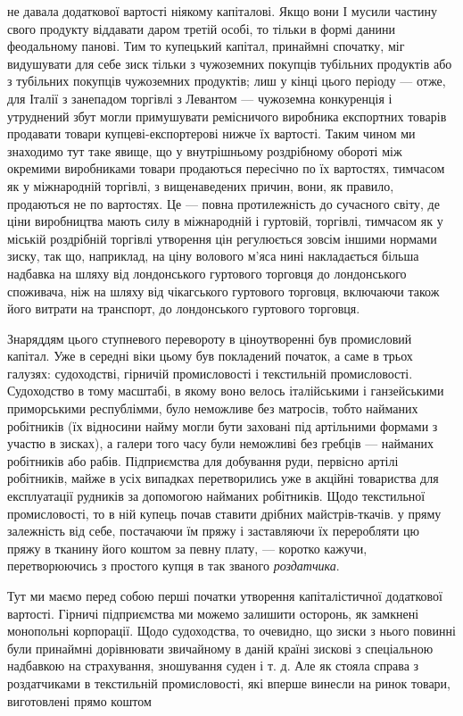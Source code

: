 \parcont{}  %
не давала додаткової вартості ніякому капіталові. Якщо вони І мусили частину свого продукту віддавати даром третій особі, то
тільки в формі данини феодальному панові. Тим то купецький капітал, принаймні спочатку, міг видушувати для себе зиск тільки
з чужоземних покупців тубільних продуктів або з тубільних покупців чужоземних продуктів; лиш у кінці цього періоду — отже,
для Італії з занепадом торгівлі з Левантом — чужоземна конкуренція і утруднений збут могли примушувати ремісничого виробника
експортних товарів продавати товари купцеві-експортерові нижче їх вартості. Таким чином ми знаходимо тут таке явище, що у
внутрішньому роздрібному обороті між окремими виробниками товари продаються пересічно по їх вартостях, тимчасом як у
міжнародній торгівлі, з вищенаведених причин, вони, як правило, продаються не по вартостях. Це — повна протилежність до
сучасного світу, де ціни виробництва мають силу в міжнародній і гуртовій, торгівлі, тимчасом як у міській роздрібній
торгівлі утворення цін регулюється зовсім іншими нормами зиску, так що, наприклад, на ціну волового м’яса нині накладається
більша надбавка на шляху від лондонського гуртового торговця до лондонського споживача, ніж на шляху від чікагського
гуртового торговця, включаючи також його витрати на транспорт, до лондонського гуртового торговця.

Знаряддям цього
ступневого перевороту в ціноутворенні був промисловий капітал. Уже в середні віки цьому був покладений початок, а саме в
трьох галузях: судоходстві, гірничій промисловості і текстильній промисловості. Судоходство в тому масштабі, в якому воно
велось італійськими і ганзейськими приморськими республімми, було неможливе без матросів, тобто найманих робітників (їх
відносини найму могли бути заховані під артільними формами з участю в зисках), а галери того часу були неможливі без гребців
— найманих робітників або рабів. Підприємства для добування руди, первісно артілі робітників, майже в усіх випадках
перетворились уже в акційні товариства для експлуатації рудників за допомогою найманих робітників. Щодо текстильної
промисловості, то в ній купець почав ставити дрібних майстрів-ткачів. у пряму залежність від себе, постачаючи їм пряжу і
заставляючи їх переробляти цю пряжу в тканину його коштом за певну плату, — коротко кажучи, перетворюючись з простого купця
в так званого \emph{роздатчика}.

Тут ми маємо перед собою перші початки утворення капіталістичної додаткової вартості. Гірничі
підприємства ми можемо залишити осторонь, як замкнені монопольні корпорації. Щодо судоходства, то очевидно, що зиски з нього
повинні були принаймні дорівнювати звичайному в даній країні зискові з спеціальною надбавкою на страхування, зношування
суден і т. д. Але як стояла справа з роздатчиками в текстильній промисловості, які вперше винесли на ринок товари,
виготовлені прямо коштом
\parbreak{}  %
